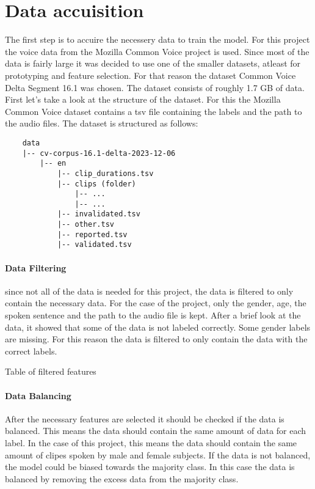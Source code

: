 \section{Data accuisition}

    The first step is to accuire the necessery data to train the model. For this project the voice data from the Mozilla Common Voice project is used. Since most of the data is fairly large it was decided to use one of the smaller datasets, atleast for prototyping and feature selection. For that reason the dataset Common Voice Delta Segment 16.1 was chosen. The dataset consists of roughly 1.7 GB of data. First let's take a look at the structure of the dataset. For this the Mozilla Common Voice dataset contains a tsv file containing the labels and the path to the audio files. 
    \break
    The dataset is structured as follows:
    
    {\iosevka
    \begin{verbatim}
    data
    |-- cv-corpus-16.1-delta-2023-12-06
        |-- en
            |-- clip_durations.tsv
            |-- clips (folder)
                |-- ...
                |-- ...
            |-- invalidated.tsv
            |-- other.tsv
            |-- reported.tsv
            |-- validated.tsv
    \end{verbatim}
    }

    \paragraph{Data Filtering}
    since not all of the data is needed for this project, the data is filtered to only contain the necessary data. For the case of the project, only the gender, age, the spoken sentence and the path to the audio file is kept. After a brief look at the data, it showed that some of the data is not labeled correctly. Some gender labels are missing. For this reason the data is filtered to only contain the data with the correct labels.

    \begin{table}[h!]
        \begin{adjustbox}{max width=\textwidth}
        \end{adjustbox}
        \caption{Table of filtered features}
    \end{table}

    \paragraph{Data Balancing}
    After the necessary features are selected it should be checked if the data is balanced. This means the data should contain the same amount of data for each label. In the case of this project, this means the data should contain the same amount of clipes spoken by male and female subjects. If the data is not balanced, the model could be biased towards the majority class. In this case the data is balanced by removing the excess data from the majority class.